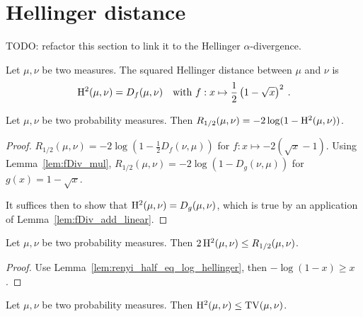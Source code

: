 \section{Hellinger distance}

TODO: refactor this section to link it to the Hellinger $\alpha$-divergence.

\begin{definition}
  \label{def:Hellinger}
  \leanok
  Let $\mu, \nu$ be two measures. The squared Hellinger distance between $\mu$ and $\nu$ is
  \begin{align*}
    \operatorname{H^2}(\mu, \nu) = D_f(\mu, \nu) \quad \text{with } f: x \mapsto \frac{1}{2}\left( 1 - \sqrt{x} \right)^2 \: .
  \end{align*}
\end{definition}

\begin{lemma}
  \label{lem:renyi_half_eq_log_hellinger}
  Let $\mu, \nu$ be two probability measures. Then $R_{1/2}(\mu, \nu) = -2\log(1 - \operatorname{H^2}(\mu, \nu))$.
\end{lemma}

\begin{proof}
$R_{1/2}(\mu, \nu) = -2 \log (1 - \frac{1}{2} D_f(\nu, \mu))$ for $f : x \mapsto -2 (\sqrt{x} - 1)$. Using Lemma~\ref{lem:fDiv_mul}, $R_{1/2}(\mu, \nu) = -2 \log (1 - D_g(\nu, \mu))$ for $g(x) = 1 - \sqrt{x}$.

It suffices then to show that $\operatorname{H^2}(\mu, \nu) = D_g(\mu, \nu)$, which is true by an application of Lemma~\ref{lem:fDiv_add_linear}.
\end{proof}

\begin{lemma}
  \label{lem:hellinger_le_renyi}
  Let $\mu, \nu$ be two probability measures. Then $2 \operatorname{H^2}(\mu, \nu) \le R_{1/2}(\mu, \nu)$.
\end{lemma}

\begin{proof}
Use Lemma~\ref{lem:renyi_half_eq_log_hellinger}, then $-\log(1 - x) \ge x$.
\end{proof}

\begin{lemma}
  \label{lem:hellinger_le_tv}
  Let $\mu, \nu$ be two probability measures. Then $\operatorname{H^2}(\mu, \nu) \le \operatorname{TV}(\mu, \nu)$.
\end{lemma}

